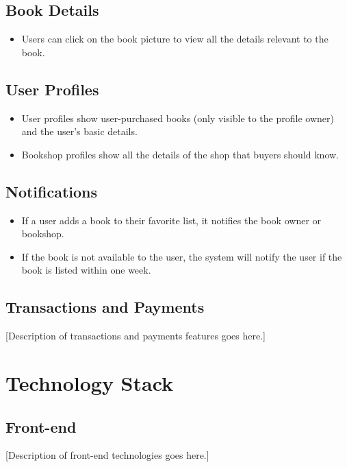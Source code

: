 \documentclass{article}
\begin{document}
\subsection{Book Details}
\begin{itemize}
  \item Users can click on the book picture to view all the details relevant to the book.
\end{itemize}

\subsection{User Profiles}
\begin{itemize}
  \item User profiles show user-purchased books (only visible to the profile owner) and the user's basic details.
  \item Bookshop profiles show all the details of the shop that buyers should know.
\end{itemize}

\subsection{Notifications}
\begin{itemize}
  \item If a user adds a book to their favorite list, it notifies the book owner or bookshop.
  \item If the book is not available to the user, the system will notify the user if the book is listed within one week.
\end{itemize}

\subsection{Transactions and Payments}
[Description of transactions and payments features goes here.]

\section{Technology Stack}

\subsection{Front-end}
[Description of front-end technologies goes here.]
\end{document}
